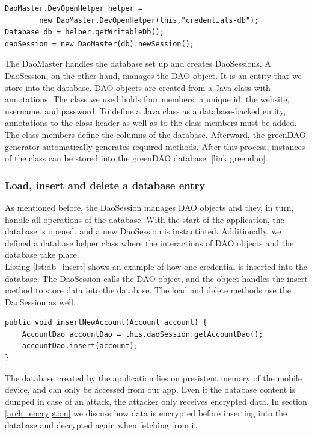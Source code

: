 \begin{lstlisting}[caption=Creation of database, label=lst:db_master]
DaoMaster.DevOpenHelper helper = 
        new DaoMaster.DevOpenHelper(this,"credentials-db");
Database db = helper.getWritableDb();
daoSession = new DaoMaster(db).newSession();
\end{lstlisting}
\vspace{0.5cm}

The DaoMaster handles the database set up and creates DaoSessions. A DaoSession, on the other hand, manages the DAO object. It is an entity that we store into the database. DAO objects are created from a Java class with annotations. The class we used holds four members: a unique id, the website, username, and password. To define a Java class as a database-backed entity, annotations to the class-header as well as to the class members must be added. The class members define the columns of the database. Afterward, the greenDAO generator automatically generates required methods. After this process, instances of the class can be stored into the greenDAO database. [link greendao]. \\

\subsubsection*{Load, insert and delete a database entry}
As mentioned before, the DaoSession manages DAO objects and they, in turn, handle all operations of the database. With the start of the application, the database is opened, and a new DaoSession is instantiated.
Additionally, we defined a database helper class where the interactions of DAO objects and the database take place. \\
Listing \ref{lst:db_insert} shows an example of how one credential is inserted into the database. The DaoSession calls the DAO object, and the object handles the insert method to store data into the database. The load and delete methods use the DaoSession as well. \\


\begin{lstlisting}[caption= Insert entry into database, label=lst:db_insert]
public void insertNewAccount(Account account) {
    AccountDao accountDao = this.daoSession.getAccountDao();
    accountDao.insert(account);
}
\end{lstlisting}
\vspace{0.5cm}


The database created by the application lies on presistent memory of the mobile device, and can only be accessed from our app. Even if the database content is dumped in case of an attack, the attacker only receives encrypted data. In section \ref{arch_encryption} we discuss how data is encrypted before inserting into the database and decrypted again when fetching from it.

